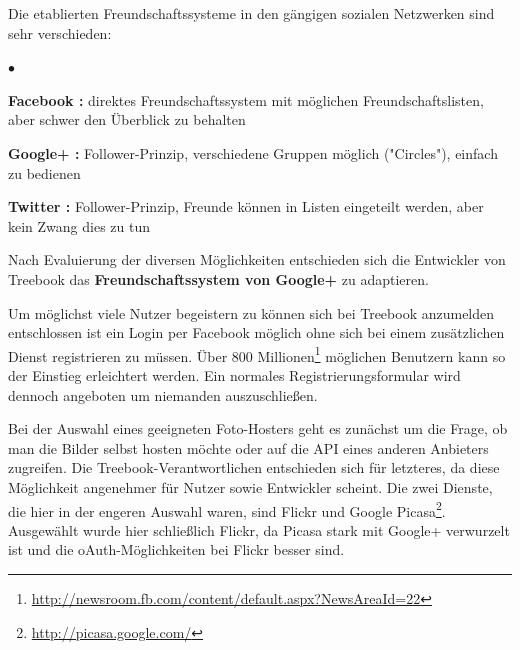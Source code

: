 \documentclass[10pt,a4paper]{book}
\begin{document}
Die etablierten Freundschaftssysteme in den gängigen sozialen Netzwerken sind sehr verschieden:
\begin{list}{$\bullet$}{}
\item \textbf{Facebook :} direktes Freundschaftssystem mit möglichen Freundschaftslisten, aber schwer den Überblick zu behalten
\item \textbf{Google+ :} Follower-Prinzip, verschiedene Gruppen möglich ("Circles"), einfach zu bedienen
\item \textbf{Twitter :} Follower-Prinzip, Freunde können in Listen eingeteilt werden, aber kein Zwang dies zu tun
\end{list}
Nach Evaluierung der diversen Möglichkeiten entschieden sich die Entwickler von Treebook das \textbf{Freundschaftssystem von Google+} zu adaptieren.

Um möglichst viele Nutzer begeistern zu können sich bei Treebook anzumelden entschlossen ist ein Login per Facebook möglich ohne sich bei einem zusätzlichen Dienst registrieren zu müssen. Über 800 Millionen\footnote{\href{http://newsroom.fb.com/content/default.aspx?NewsAreaId=22}{http://newsroom.fb.com/content/default.aspx?NewsAreaId=22}} möglichen Benutzern kann so der Einstieg erleichtert werden. Ein normales Registrierungsformular wird dennoch angeboten um niemanden auszuschließen.

Bei der Auswahl eines geeigneten Foto-Hosters geht es zunächst um die Frage, ob man die Bilder selbst hosten möchte oder auf die API eines anderen Anbieters zugreifen. Die Treebook-Verantwortlichen entschieden sich für letzteres, da diese Möglichkeit angenehmer für Nutzer sowie Entwickler scheint. Die zwei Dienste, die hier in der engeren Auswahl waren, sind Flickr und Google Picasa\footnote{\href{http://picasa.google.com/}{http://picasa.google.com/}}. Ausgewählt wurde hier schließlich Flickr, da Picasa stark mit Google+ verwurzelt ist und die oAuth-Möglichkeiten bei Flickr besser sind.  
\end{document}
